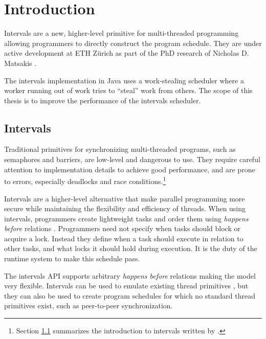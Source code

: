 
\chapter{Introduction}
\label{chap:introduction}

Intervals \cite{Matsakis2009a} are a new, higher-level primitive for
multi-threaded programming allowing programmers to directly construct
the program schedule. They are under active development at ETH Zürich
as part of the PhD research of Nicholas D. Matsakis
\cite{Matsakis2010}.

The intervals implementation in Java uses a work-stealing scheduler
where a worker running out of work tries to ``steal'' work from
others. The scope of this thesis is to improve the performance of the
intervals scheduler.


\section{Intervals}
\label{sec:intro-intervals}

Traditional primitives for synchronizing multi-threaded programs, such
as semaphores and barriers, are low-level and dangerous to use. They
require careful attention to implementation details to achieve good
performance, and are prone to errors, especially deadlocks and race
conditions.\footnote{Section \ref{sec:intro-intervals} summarizes the
  introduction to intervals written by \textcite{Matsakis2010a}.}

Intervals are a higher-level alternative that make parallel
programming more secure while maintaining the flexibility and
efficiency of threads. When using intervals, programmers create
lightweight tasks and order them using \emph{happens before} relations
\cite{Lamport1978}. Programmers need not specify when tasks should
block or acquire a lock. Instead they define when a task should
execute in relation to other tasks, and what locks it should hold
during execution. It is the duty of the runtime system to make this
schedule pass.

The intervals API supports arbitrary \emph{happens before} relations
making the model very flexible. Intervals can be used to emulate
existing thread primitives \cite{Matsakis2009a}, but they can also be
used to create program schedules for which no standard thread
primitives exist, such as peer-to-peer synchronization.

